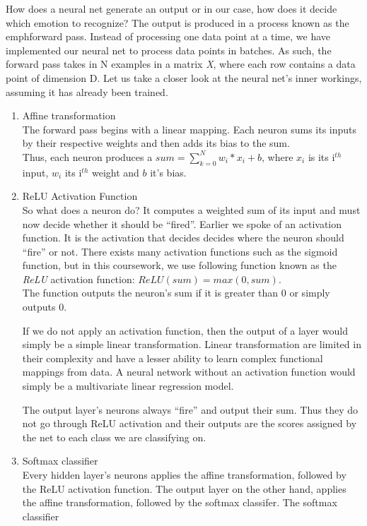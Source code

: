 How does a neural net generate an output or in our case, how does it decide which emotion to recognize?
The output is produced in a process known as the emph{forward pass}.
Instead of processing one data point at a time,
we have implemented our neural net to process data points in batches.
As such, the forward pass takes in N examples in a matrix \emph{X}, where each row contains a data point of dimension D.
Let us take a closer look at the neural net's inner workings, assuming it has already been trained.

\begin{enumerate}
   \item Affine transformation\\
     The forward pass begins with a linear mapping.
     Each neuron sums its inputs by their respective weights and then adds its bias to the sum.\\
     Thus, each neuron produces a $sum = \sum_{k=0}^{N} w_i * x_i + b$,
     where $x_i$ is its i$^{th}$ input, $w_i$ its i$^{th}$ weight and $b$ it's bias.
     
   \item ReLU Activation Function\\
     So what does a neuron do? It computes a weighted sum of its input and must now decide whether it should be ``fired''.
     Earlier we spoke of an activation function.
     It is the activation that decides decides where the neuron should ``fire'' or not. 
     There exists many activation functions such as the sigmoid function,
     but in this coursework, we use following function known as the \emph{ReLU} activation function:
     $ReLU(sum) = max(0,sum)$.\\
     The function outputs the neuron's sum if it is greater than 0 or simply outputs 0.

     If we do not apply an activation function, then the output of a layer would simply be a simple linear transformation.
     Linear transformation are limited in their complexity and have a lesser ability to learn complex functional mappings from data.
     A neural network without an activation function would simply be a multivariate linear regression model.

     The output layer's neurons always ``fire'' and output their sum.
     Thus they do not go through ReLU activation and
     their outputs are the scores assigned by the net to each class we are classifying on.
     
   \item Softmax classifier\\
     Every hidden layer's neurons applies the affine transformation, followed by the ReLU activation function.
     The output layer on the other hand,  applies the affine transformation, followed by the softmax classifer.
     The softmax classifier 





\end{enumerate}
